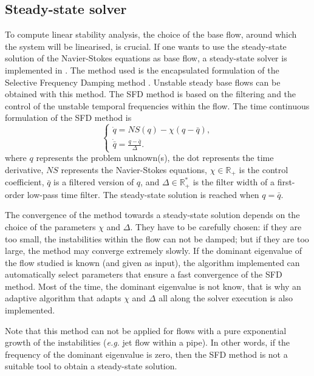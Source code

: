 \subsection{Steady-state solver}
\label{SectionSFD}

To compute linear stability analysis, the choice of the base flow, around which the system will be linearised, is crucial. If one wants to use the steady-state solution of the Navier-Stokes equations as base flow, a steady-state solver is implemented in \nekpp. The method used is the encapsulated formulation of the Selective Frequency Damping method \cite{JoCoSh14}. Unstable steady base flows can be obtained with this method. The SFD method is based on the filtering and the control of the unstable temporal frequencies within the flow. The time continuous formulation of the SFD method is
\begin{equation}
\begin{cases}
\dot{q}=NS(q)-\chi (q-\bar{q}), \\
\dot{\bar{q}}=\frac{q-\bar{q}}{\Delta}.
\end{cases}
\label{SFD-General}
\end{equation}
where $q$ represents the problem unknown(s), the dot represents the time derivative, $NS$ represents the Navier-Stokes equations, $\chi \in \mathbb{R}_+$ is the control coefficient, $\bar{q}$ is a filtered version of $q$, and $\Delta \in \mathbb{R}_+ ^*$ is the filter width of a first-order low-pass time filter. The steady-state solution is reached when $q=\bar{q}$.

The convergence of the method towards a steady-state solution depends on the choice of the parameters $\chi$ and $\Delta$. They have to be carefully chosen: if they are too small, the instabilities within the flow can not be damped; but if they are too large, the method may converge extremely slowly. If the dominant eigenvalue of the flow studied is known (and given as input), the algorithm implemented can automatically select parameters that ensure a fast convergence of the SFD method. Most of the time, the dominant eigenvalue is not know, that is why an adaptive algorithm that adapts $\chi$ and $\Delta$ all along the solver execution is also implemented.

Note that this method can not be applied for flows with a pure exponential growth of the instabilities (\textit{e.g.} jet flow within a pipe). In other words, if the frequency of the dominant eigenvalue is zero, then the SFD method is not a suitable tool to obtain a steady-state solution.



